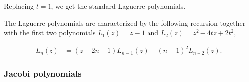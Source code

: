     Replacing $t=1$, we get the standard Laguerre polynomials.

    The Laguerre polynomials are characterized by the following recursion together with the first two polynomials $L_1(z)=z-1$ and $L_2(z)=z^2-4tz + 2t^2$,

    \begin{align*}
        L_n(z) &= (z-2n+1)L_{n-1}(z) - (n-1)^2L_{n-2}(z).
    \end{align*}








\subsubsection{Jacobi polynomials}
    
